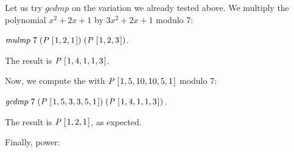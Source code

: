 \documentclass[tikz]{scrreprt}
\newcommand{\Conid}[1]{\mathit{#1}}
\newcommand{\Varid}[1]{\mathit{#1}}
\begin{document}
Let us try \ensuremath{\Varid{gcdmp}} on the variation we already tested above. 
We multiply the polynomial
$x^2 + 2x + 1$ by $3x^2 + 2x + 1$ modulo 7:

\ensuremath{\Varid{mulmp}\;\mathrm{7}\;(\Conid{P}\;[\mskip1.5mu \mathrm{1},\mathrm{2},\mathrm{1}\mskip1.5mu])\;(\Conid{P}\;[\mskip1.5mu \mathrm{1},\mathrm{2},\mathrm{3}\mskip1.5mu])}.

The result is \ensuremath{\Conid{P}\;[\mskip1.5mu \mathrm{1},\mathrm{4},\mathrm{1},\mathrm{1},\mathrm{3}\mskip1.5mu]}.

Now, we compute the  with \ensuremath{\Conid{P}\;[\mskip1.5mu \mathrm{1},\mathrm{5},\mathrm{10},\mathrm{10},\mathrm{5},\mathrm{1}\mskip1.5mu]} modulo 7:

\ensuremath{\Varid{gcdmp}\;\mathrm{7}\;(\Conid{P}\;[\mskip1.5mu \mathrm{1},\mathrm{5},\mathrm{3},\mathrm{3},\mathrm{5},\mathrm{1}\mskip1.5mu])\;(\Conid{P}\;[\mskip1.5mu \mathrm{1},\mathrm{4},\mathrm{1},\mathrm{1},\mathrm{3}\mskip1.5mu])}.

The result is \ensuremath{\Conid{P}\;[\mskip1.5mu \mathrm{1},\mathrm{2},\mathrm{1}\mskip1.5mu]}, as expected.

Finally, power:
\end{document}
